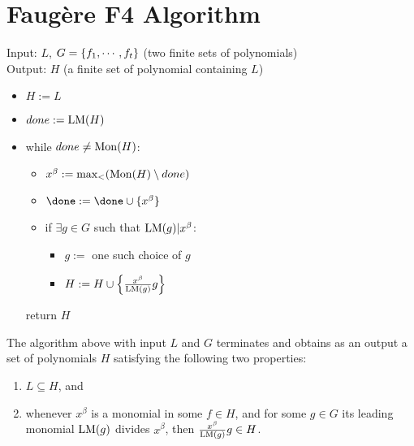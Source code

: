 \chapter{Faug{\`e}re F4 Algorithm}

\begin{definition}
    Input: \(L\), \(G = \{ f_1, \cdots, f_t \}\)
    (two finite sets of polynomials) \\
    Output: \(H\) (a finite set of polynomial containing \(L\)) \\

    \begin{itemize}
        \item \(H := L\)
        \item \(done := \mathrm{LM}(H)\)
        \item while \(done \ne \mathrm{Mon}(H)\):
        \begin{itemize}
            \item \(x^\beta := \max_{<} (\mathrm{Mon}(H) \setminus done)\)
            \item \(\done := \done \cup \sset{x^\beta}\)
            \item if \(\exists g \in G\) such that \(\mathrm{LM}(g) | x^\beta\):
                \begin{itemize}
                    \item \(g :=\) one such choice of \(g\)
                    \item \(H := H \cup \left\{ \frac{x^\beta}{\mathrm{LM}(g)} g \right\}\)
                \end{itemize}
        \end{itemize}
        return \(H\)
    \end{itemize}
\end{definition}

\begin{theorem}
    The algorithm above with input \(L\) and \(G\) terminates and obtains as an
    output a set of polynomials \(H\) satisfying the following two properties:
    \begin{enumerate}[label=\textbf{(\roman*)}]
        \item \(L \subseteq H\), and
        \item whenever \(x^\beta\) is a monomial in some \(f \in H\), and for
        some \(g \in G\) its leading monomial \(\mathrm{LM}(g)\) divides
        \(x^\beta\), then \(\frac{x^\beta}{\mathrm{LM}(g)} g \in H\).
    \end{enumerate}
\end{theorem}


